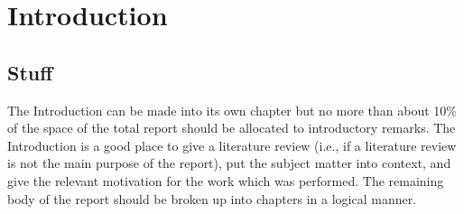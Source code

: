 
\chapter{Introduction} %

\label{Introduction} %


\section{Stuff}
The Introduction
can be made into its own chapter but no more than about 10\% of the space of the total report
should be allocated to introductory remarks. The Introduction is a good place to give a literature
review (i.e., if a literature review is not the main purpose of the report), put the subject matter into
context, and give the relevant motivation for the work which was performed. The remaining body
of the report should be broken up into chapters in a logical manner.
